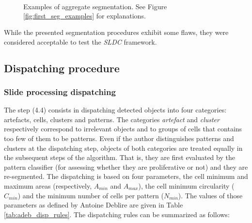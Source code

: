 \begin{figure}
	\center
	\subfigure{
	} \\
	\subfigure{
	} \\
	\subfigure{
	} \\
	\subfigure{
	}
	\caption{Examples of aggregate segmentation. See Figure \ref{fig:first_seg_examples} for explanations.}
	\label{fig:second_seg_examples}
\end{figure}

While the presented segmentation procedures exhibit some flaws, they were considered acceptable to test the \textit{SLDC} framework. 

\subsection{Dispatching procedure}
\label{ssec:thyroid_ad_dispatch}

\subsubsection{Slide processing dispatching}

The step (4.4) consists in dispatching detected objects into four categories: artefacts, cells, clusters and patterns. The categories \textit{artefact} and \textit{cluster} respectively correspond to irrelevant objects and to groups of cells that contains too few of them to be patterns. Even if the author distinguishes patterns and clusters at the dispatching step, objects of both categories are treated equally in the subsequent steps of the algorithm. That is, they are first evaluated by the pattern classifier (for assessing whether they are proliferative or not) and they are re-segmented. The dispatching is based on four parameters, the cell minimum and maximum areas (respectively, $A_{min}$ and $A_{max}$), the cell minimum circularity ($C_{min}$) and the minimum number of cells per pattern ($N_{min}$). The values of those parameters as defined by Antoine Deblire are given in Table \ref{tab:adeb_disp_rules}. The dispatching rules can be summarized as follows:


